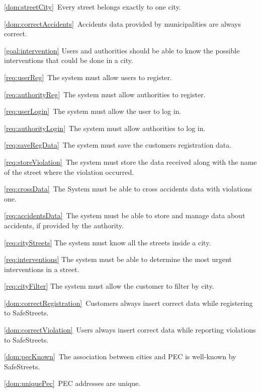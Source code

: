 \begin{description}
\begin{description}
					\item \ref{dom:streetCity}\ Every street belongs exactly to one city.
					\item \ref{dom:correctAccidents}\ Accidents data provided by municipalities are always correct.
				\end{description}	
			\item \ref{goal:intervention} Users and authorities should be able to know the possible interventions that could be done in a city.
				\begin{description}
					\item \ref{req:userReg}\ The system must allow users to register.
					\item \ref{req:authorityReg}\ The system must allow authorities to register.
					\item \ref{req:userLogin}\ The system must allow the user to log in.
					\item \ref{req:authorityLogin}\ The system must allow authorities to log in.
					\item \ref{req:saveRegData}\ The system must save the customers registration data.
					\item \ref{req:storeViolation}\ The system must store the data received along with the name of the street where the violation occurred.
					\item \ref{req:crossData}\ The System must be able to cross accidents data with violations one.
					\item \ref{req:accidentsData}\ The system must be able to store and manage data about accidents, if provided by the authority.
					\item \ref{req:cityStreets} The system must know all the streets inside a city.
					\item \ref{req:interventions} The system must be able to determine the most urgent interventions in a street.
					\item \ref{req:cityFilter} The system must allow the customer to filter by city.
					\item \ref{dom:correctRegistration}\ Customers always insert correct data while registering to SafeStreets.
					\item \ref{dom:correctViolation}\ Users always insert correct data while reporting violations to SafeStreets.
					\item \ref{dom:pecKnown}\ The association between cities and PEC is well-known by SafeStreets.
					\item \ref{dom:uniquePec}\ PEC addresses are unique.

\end{description}
\end{description}
